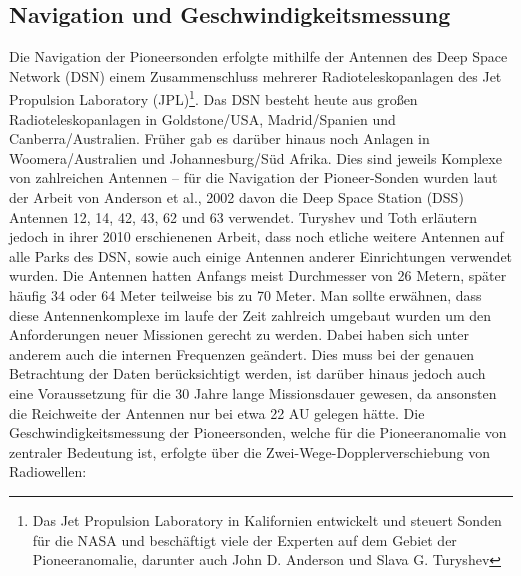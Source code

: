 
\subsection{Navigation und Geschwindigkeitsmessung}\label{messung}
Die Navigation der Pioneersonden erfolgte mithilfe der Antennen des Deep Space Network (DSN) einem Zusammenschluss mehrerer Radioteleskopanlagen des Jet Propulsion Laboratory (JPL)\footnote{Das Jet Propulsion Laboratory in Kalifornien entwickelt und steuert Sonden für die NASA und beschäftigt viele der Experten auf dem Gebiet der Pioneeranomalie, darunter auch John D. Anderson und Slava G. Turyshev}. Das DSN besteht heute aus großen Radioteleskopanlagen in Goldstone/USA, Madrid/Spanien und Canberra/Australien. Früher gab es darüber hinaus noch Anlagen in Woomera/Australien und Johannesburg/Süd Afrika.\cite{Anderson2002}\cite{Turyshev2010} Dies sind jeweils Komplexe von zahlreichen Antennen – für die Navigation der Pioneer-Sonden wurden laut der Arbeit von Anderson et al., 2002\cite{Anderson2002} davon die Deep Space Station (DSS) Antennen 12, 14, 42, 43, 62 und 63 verwendet. Turyshev und Toth erläutern jedoch in ihrer 2010 erschienenen Arbeit, dass noch etliche weitere Antennen auf alle Parks des DSN, sowie auch einige Antennen anderer Einrichtungen verwendet wurden.\cite{Turyshev2010} Die Antennen hatten Anfangs meist Durchmesser von 26 Metern, später häufig 34 oder 64 Meter teilweise bis zu 70 Meter.\cite{Turyshev2010}
Man sollte erwähnen, dass diese Antennenkomplexe im laufe der Zeit zahlreich umgebaut wurden um den Anforderungen neuer Missionen gerecht zu werden. Dabei haben sich unter anderem auch die internen Frequenzen geändert\cite{Anderson2002}. Dies muss bei der genauen Betrachtung der Daten berücksichtigt werden, ist darüber hinaus jedoch auch eine Voraussetzung für die 30 Jahre lange Missionsdauer gewesen, da ansonsten die Reichweite der Antennen nur bei etwa 22 AU gelegen hätte.\cite{Turyshev2010}
Die Geschwindigkeitsmessung der Pioneersonden, welche für die Pioneeranomalie von zentraler Bedeutung ist, erfolgte über die Zwei-Wege-Dopplerverschiebung von Radiowellen:


